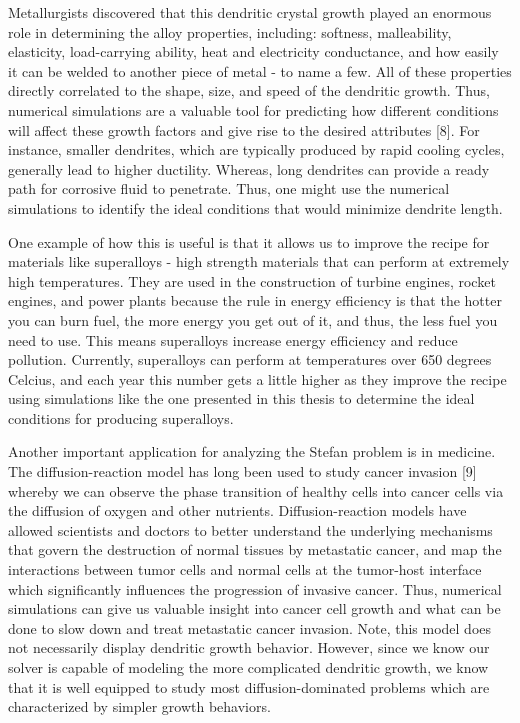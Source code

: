 \documentclass[oneside,12pt,final]{/Applications/TeX/packages/ucthesis-CA2012}
\begin{document}
\begin{mainmatter}
Metallurgists discovered that this dendritic crystal growth played an enormous role in determining the alloy properties, including: softness, malleability, elasticity, load-carrying ability, heat and electricity conductance, and how easily it can be welded to another piece of metal - to name a few. All of these properties directly correlated to the shape, size, and speed of the dendritic growth. Thus, numerical simulations are a valuable tool for predicting how different conditions will affect these growth factors and give rise to the desired attributes [8]. For instance, smaller dendrites, which are typically produced by rapid cooling cycles, generally lead to higher ductility. Whereas, long dendrites can provide a ready path for corrosive fluid to penetrate. Thus, one might use the numerical simulations to identify the ideal conditions that would minimize dendrite length.

One example of how this is useful is that it allows us to improve the recipe for materials like superalloys - high strength materials that can perform at extremely high temperatures. They are used in the construction of turbine engines, rocket engines, and power plants because the rule in energy efficiency is that the hotter you can burn fuel, the more energy you get out of it, and thus, the less fuel you need to use. This means superalloys increase energy efficiency and reduce pollution. Currently, superalloys can perform at temperatures over 650 degrees Celcius, and each year this number gets a little higher as they improve the recipe using simulations like the one presented in this thesis to determine the ideal conditions for producing superalloys.

Another important application for analyzing the Stefan problem is in medicine. The diffusion-reaction model has long been used to study cancer invasion [9] whereby we can observe the phase transition of healthy cells into cancer cells via the diffusion of oxygen and other nutrients. Diffusion-reaction models have allowed scientists and doctors to better understand the underlying mechanisms that govern the destruction of normal tissues by metastatic cancer, and map the interactions between tumor cells and normal cells at the tumor-host interface which significantly influences the progression of invasive cancer. Thus, numerical simulations can give us valuable insight into cancer cell growth and what can be done to slow down and treat metastatic cancer invasion. Note, this model does not necessarily display dendritic growth behavior. However, since we know our solver is capable of modeling the more complicated dendritic growth, we know that it is well equipped to study most diffusion-dominated problems which are characterized by simpler growth behaviors.


\end{mainmatter}
\end{document}
